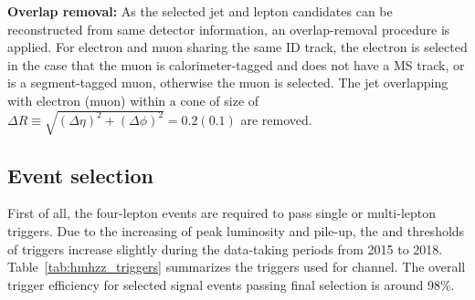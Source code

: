 \textbf{Overlap removal:}
As the selected jet and lepton candidates can be reconstructed from same detector information, an overlap-removal procedure is applied.
For electron and muon sharing the same ID track, the electron is selected in the case that the muon is calorimeter-tagged and does not have a MS track, or is a segment-tagged muon, otherwise the muon is selected.
The jet overlapping with electron (muon) within a cone of size of $\Delta R\equiv \sqrt{(\Delta \eta)^2 + (\Delta \phi)^2}= 0.2 (0.1)$ are removed.

\subsection{Event selection}
\label{sec:hmhzz_eventsel}

First of all, the four-lepton events are required to pass single or multi-lepton triggers.
Due to the increasing of peak luminosity and pile-up, the \pt and \et thresholds of triggers increase slightly during the data-taking periods from 2015 to 2018.
Table~\ref{tab:hmhzz_triggers} summarizes the triggers used for \llll channel. 
The overall trigger efficiency for selected signal events passing final selection is around 98\%.

